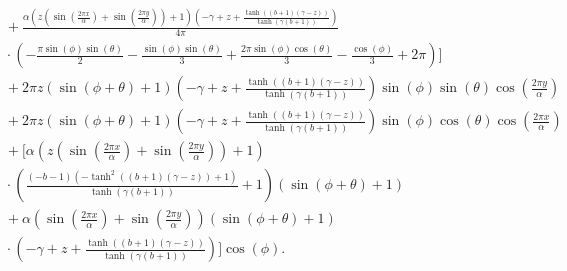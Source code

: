 \begin{align}
  &\quad + \frac{\alpha \left(z \left(\sin{\left (\frac{2 \pi x}{\alpha} \right )} + \sin{\left (\frac{2 \pi y}{\alpha} \right )}\right) + 1\right) \left(- \gamma + z + \frac{\tanh{\left (\left(b + 1\right) \left(\gamma - z\right) \right )}}{\tanh{\left (\gamma \left(b + 1\right) \right )}}\right)}{4 \pi} \nonumber\\
  &\quad \cdot \left(- \frac{\pi \sin{\left (\phi \right )} \sin{\left (\theta \right )}}{2} - \frac{\sin{\left(\phi\right)}\sin{\left(\theta\right)}}{3} + \frac{2 \pi \sin{\left (\phi \right )} \cos{\left (\theta \right )}}{3} - \frac{\cos{\left (\phi \right )}}{3} + 2 \pi\right) \Bigg] \nonumber\\
  &\quad + 2 \pi z \left(\sin{\left (\phi + \theta \right )} + 1\right) \left(- \gamma + z + \frac{\tanh{\left (\left(b + 1\right) \left(\gamma - z\right) \right )}}{\tanh{\left (\gamma \left(b + 1\right) \right )}}\right) \sin{\left (\phi \right )} \sin{\left (\theta \right )} \cos{\left (\frac{2 \pi y}{\alpha} \right )} \nonumber\\
  &\quad + 2 \pi z \left(\sin{\left (\phi + \theta \right )} + 1\right) \left(- \gamma + z + \frac{\tanh{\left (\left(b + 1\right) \left(\gamma - z\right) \right )}}{\tanh{\left (\gamma \left(b + 1\right) \right )}}\right) \sin{\left (\phi \right )} \cos{\left (\theta \right )} \cos{\left (\frac{2 \pi x}{\alpha} \right )} \nonumber\\
  &\quad + \Bigg[\alpha \left(z \left(\sin{\left (\frac{2 \pi x}{\alpha} \right )} + \sin{\left (\frac{2 \pi y}{\alpha} \right )}\right) + 1\right) \nonumber\\
  &\quad \cdot \left(\frac{\left(- b - 1\right) \left(- \tanh^{2}{\left (\left(b + 1\right) \left(\gamma - z\right) \right )} + 1\right)}{\tanh{\left (\gamma \left(b + 1\right) \right )}} + 1\right) %
  \left(\sin{\left (\phi + \theta \right )} + 1\right) \nonumber\\
  &\quad + \alpha \left(\sin{\left (\frac{2 \pi x}{\alpha} \right )} + \sin{\left (\frac{2 \pi y}{\alpha} \right )}\right) \left(\sin{\left (\phi + \theta \right )} + 1\right) \nonumber\\
  &\quad \cdot \left(- \gamma + z + \frac{\tanh{\left (\left(b + 1\right) \left(\gamma - z\right) \right )}}{\tanh{\left (\gamma \left(b + 1\right) \right )}}\right)\Bigg] \cos{\left (\phi \right )}.
  \label{eqn:mms_source_expr}
\end{align}
